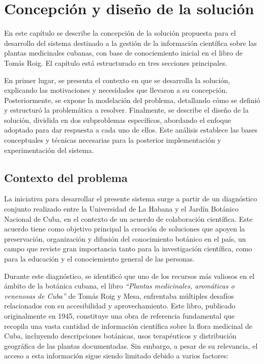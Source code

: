 \chapter{Concepción y diseño de la solución}\label{chapter:solutionDesign}
En este capítulo se describe la concepción de la solución propuesta para el desarrollo 
del sistema destinado a la gestión de la información científica sobre las 
plantas medicinales cubanas, con base de conociemiento inicial en el libro de Tomás Roig. 
El capítulo está estructurado en tres secciones principales.

En primer lugar, se presenta el contexto en que se desarrolla la solución, 
explicando las motivaciones y necesidades que llevaron a su concepción. 
Posteriormente, se expone la modelación del problema, detallando cómo se definió y 
estructuró la problemática a resolver. 
Finalmente, se describe el diseño de la solución, dividida en dos subproblemas específicos, 
abordando el enfoque adoptado para dar respuesta a cada uno de ellos. 
Este análisis establece las bases conceptuales y técnicas necesarias para la 
posterior implementación y experimentación del sistema.
\newpage



\section{Contexto del problema}
La iniciativa para desarrollar el presente sistema surge a partir de un diagnóstico 
conjunto realizado entre la Universidad de La Habana y el Jardín Botánico Nacional de Cuba, 
en el contexto de un acuerdo de colaboración científica. 
Este acuerdo tiene como objetivo principal la creación de soluciones que apoyen 
la preservación, organización y difusión del conocimiento botánico en el país, 
un campo que reviste gran importancia tanto para la investigación científica, 
como para la educación y el conociemiento general de las personas.

Durante este diagnóstico, se identificó que uno de los recursos más valiosos 
en el ámbito de la botánica cubana, el libro \textit{``Plantas medicinales, aromáticas o venenosas de Cuba''} 
de Tomás Roig y Mesa, enfrentaba múltiples desafíos relacionados con su accesibilidad y 
aprovechamiento. Este libro, publicado originalmente en 1945, constituye una obra 
de referencia fundamental que recopila una vasta cantidad de información científica 
sobre la flora medicinal de Cuba, incluyendo descripciones botánicas, 
usos terapéuticos y distribución geográfica de las plantas documentadas. 
Sin embargo, a pesar de su relevancia, el acceso a esta información sigue siendo 
limitado debido a varios factores:


